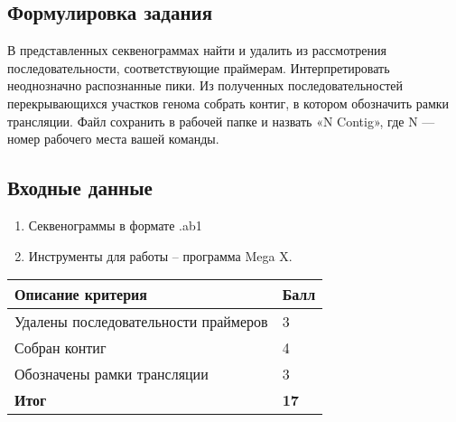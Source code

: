 
\subsection*{Формулировка задания}

В представленных секвенограммах найти и удалить из рассмотрения последовательности, соответствующие праймерам. Интерпретировать неоднозначно распознанные пики. Из полученных последовательностей перекрывающихся участков генома собрать контиг, в котором обозначить рамки трансляции. Файл сохранить в рабочей папке и назвать «N Contig», где N — номер рабочего места вашей команды.

\subsection*{Входные данные}

\begin{enumerate}
    \item Секвенограммы в формате .ab1 
    \item Инструменты для работы – программа Mega X.    
\end{enumerate}

\markSection

\begin{tabular}{|p{11cm}|p{3cm}|}
    \hline
    \textbf{Описание критерия} & \textbf{Балл} \\
    \hline
    Удалены последовательности праймеров & 3 \\
    \hline
    Собран контиг & 4 \\
    \hline
    Обозначены рамки трансляции & 3 \\
    \hline
    \hline
    \textbf{Итог} & \textbf{17} \\
    \hline
\end{tabular}